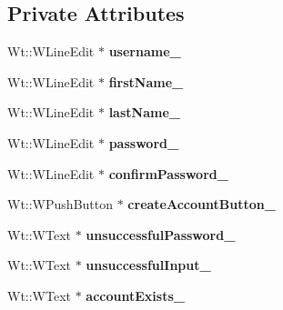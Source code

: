 \subsection*{Private Attributes}
\begin{DoxyCompactItemize}
\item 
Wt\+::\+W\+Line\+Edit $\ast$ {\bfseries username\+\_\+}\hypertarget{classCreateAccountWidget_a6845ece9134008bcd3c32bad833cbc96}{}\label{classCreateAccountWidget_a6845ece9134008bcd3c32bad833cbc96}

\item 
Wt\+::\+W\+Line\+Edit $\ast$ {\bfseries first\+Name\+\_\+}\hypertarget{classCreateAccountWidget_aa4f562845143675adef1764f57e7e3bf}{}\label{classCreateAccountWidget_aa4f562845143675adef1764f57e7e3bf}

\item 
Wt\+::\+W\+Line\+Edit $\ast$ {\bfseries last\+Name\+\_\+}\hypertarget{classCreateAccountWidget_a12fc04957268ff3dcaee4333e96d04fa}{}\label{classCreateAccountWidget_a12fc04957268ff3dcaee4333e96d04fa}

\item 
Wt\+::\+W\+Line\+Edit $\ast$ {\bfseries password\+\_\+}\hypertarget{classCreateAccountWidget_ac3e4d8093f9bfc2ed5f16b7ffa44aeda}{}\label{classCreateAccountWidget_ac3e4d8093f9bfc2ed5f16b7ffa44aeda}

\item 
Wt\+::\+W\+Line\+Edit $\ast$ {\bfseries confirm\+Password\+\_\+}\hypertarget{classCreateAccountWidget_a5af429ae5ba69d0c7b1e1bdb0f7a313e}{}\label{classCreateAccountWidget_a5af429ae5ba69d0c7b1e1bdb0f7a313e}

\item 
Wt\+::\+W\+Push\+Button $\ast$ {\bfseries create\+Account\+Button\+\_\+}\hypertarget{classCreateAccountWidget_a53c12cfed364c82a77ecedd133ccb15e}{}\label{classCreateAccountWidget_a53c12cfed364c82a77ecedd133ccb15e}

\item 
Wt\+::\+W\+Text $\ast$ {\bfseries unsuccessful\+Password\+\_\+}\hypertarget{classCreateAccountWidget_a34cb095702c7060ce35d6e6c5f42bf13}{}\label{classCreateAccountWidget_a34cb095702c7060ce35d6e6c5f42bf13}

\item 
Wt\+::\+W\+Text $\ast$ {\bfseries unsuccessful\+Input\+\_\+}\hypertarget{classCreateAccountWidget_a5b0ef52c652f912ccd9fb4f2dd5d5b94}{}\label{classCreateAccountWidget_a5b0ef52c652f912ccd9fb4f2dd5d5b94}

\item 
Wt\+::\+W\+Text $\ast$ {\bfseries account\+Exists\+\_\+}\hypertarget{classCreateAccountWidget_af8fd1df4209baed3b6037f08c9eb9e30}{}\label{classCreateAccountWidget_af8fd1df4209baed3b6037f08c9eb9e30}


\end{DoxyCompactItemize}
